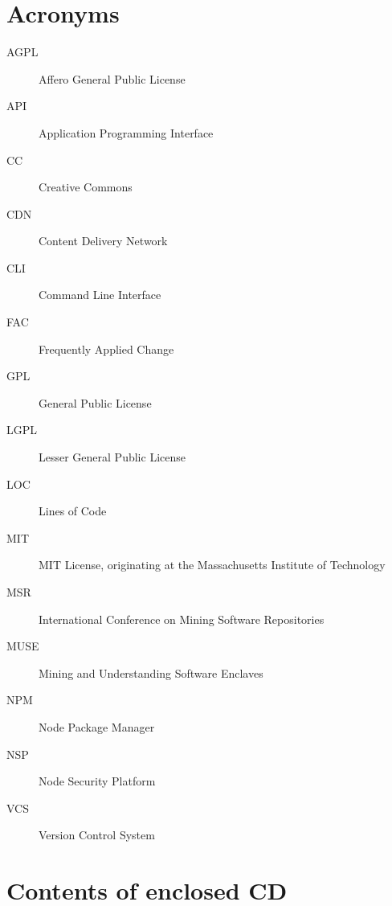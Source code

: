 \documentclass[thesis=M,english]{FITthesis}[2012/10/20]
\begin{document}



\appendix

\chapter{Acronyms}
\begin{description}
\item[AGPL] Affero General Public License
\item[API] Application Programming Interface
\item[CC] Creative Commons
\item[CDN] Content Delivery Network
\item[CLI] Command Line Interface
\item[FAC] Frequently Applied Change
\item[GPL] General Public License
\item[LGPL] Lesser General Public License
\item[LOC] Lines of Code
\item[MIT] MIT License, originating at the Massachusetts Institute of Technology
\item[MSR] International Conference on Mining Software Repositories
\item[MUSE] Mining and Understanding Software Enclaves
\item[NPM] Node Package Manager
\item[NSP] Node Security Platform
\item[VCS] Version Control System
\end{description}


\chapter{Contents of enclosed CD}


\begin{figure}
\end{figure}
\end{document}
